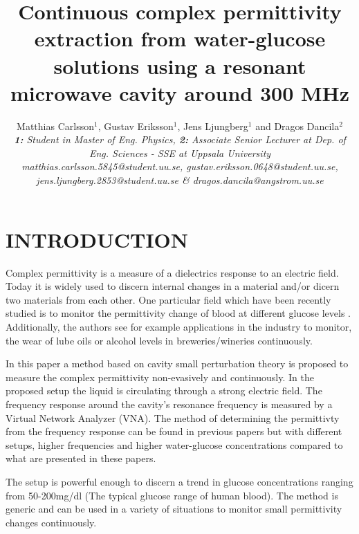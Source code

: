 \documentclass[10pt,final,conference,a4paper,twocolumn]{IEEEtran_AntennEMB_GigaHertz2016}
\begin{document}
\title{Continuous complex permittivity extraction from water-glucose solutions using a resonant microwave cavity around 300 MHz}

\author{Matthias Carlsson$^1$, Gustav Eriksson$^1$, Jens Ljungberg$^1$ and Dragos Dancila$^2$ \\
\em \small \textbf{1:} Student in Master of Eng. Physics, \textbf{2:} Associate Senior Lecturer at Dep. of Eng. Sciences - SSE at Uppsala University \\
\em \small matthias.carlsson.5845@student.uu.se, gustav.eriksson.0648@student.uu.se, \\
\em \small jens.ljungberg.2853@student.uu.se \& dragos.dancila@angstrom.uu.se
}

\maketitle
\section{INTRODUCTION}
 Complex permittivity is a measure of a dielectrics response to an electric field. Today it is widely used to discern internal changes in a material and/or dicern two materials from each other. One particular field which have been recently studied is to monitor the permittivity change of blood at different glucose levels \cite{c2}. Additionally,  the authors see for example applications in the industry to monitor, the wear of lube oils or alcohol levels in breweries/wineries continuously.
 
 In this paper a method based on cavity small perturbation theory \cite{c3} is proposed to measure the complex permittivity non-evasively and continuously. In the proposed setup the liquid is circulating through a strong electric field. The frequency response around the cavity's resonance frequency is measured by a Virtual Network Analyzer (VNA). The method of determining the permittivty from the frequency response can be found in previous papers \cite{c2}\cite{c1} but with different setups, higher frequencies and higher water-glucose concentrations compared to what are presented in these papers.
 
 The setup is powerful enough to discern a trend in glucose concentrations ranging from 50-200mg/dl (The typical glucose range of human blood). The method is generic and can be used in a variety of situations to monitor small permittivity changes continuously.
\end{document}
